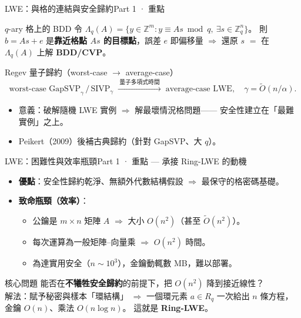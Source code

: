 \documentclass[aspectratio=169, 11pt]{beamer}
\newcommand{\Z}{\mathbb{Z}}
\begin{document}
\begin{frame}{LWE：與格的連結與安全歸約}{Part 1 · 重點}
  \begin{block}{$q$-ary 格上的 BDD}
    令 $\Lambda_q(A)=\{y\in\Z^m: y\equiv As \bmod q,\ \exists s\in\Z_q^n\}$。
    則 $b=As+e$ 是\textbf{靠近格點 $As$ 的目標點}，誤差 $e$ 即偏移量
    $\Rightarrow$ 還原 $s$ $=$ 在 $\Lambda_q(A)$ 上解 \textbf{BDD/CVP}。
  \end{block}
  \begin{block}{Regev 量子歸約（worst-case $\to$ average-case）}
    \[
      \text{worst-case GapSVP}_\gamma \,/\, \text{SIVP}_\gamma
      \;\xrightarrow{\ \text{量子多項式時間}\ }\;
      \text{average-case LWE},\quad \gamma=\tilde{O}(n/\alpha).
    \]
  \end{block}
  \begin{itemize}\small
    \item 意義：\alert{破解隨機 LWE 實例} $\Rightarrow$ \alert{解最壞情況格問題}——
      安全性建立在「最難實例」之上。
    \item Peikert（2009）後補古典歸約（針對 GapSVP、大 $q$）。
  \end{itemize}
\end{frame}

\begin{frame}{LWE：困難性與效率瓶頸}{Part 1 · 重點 — 承接 Ring-LWE 的動機}
  \begin{itemize}\small
    \item \textbf{優點}：安全性歸約乾淨、無額外代數結構假設 $\Rightarrow$ 最保守的格密碼基礎。
    \item \textbf{致命瓶頸（效率）}：
      \begin{itemize}
        \item 公鑰是 $m\times n$ 矩陣 $A$ $\Rightarrow$ 大小 $O(n^2)$（甚至 $\tilde O(n^2)$）。
        \item 每次運算為一般矩陣–向量乘 $\Rightarrow$ $O(n^2)$ 時間。
        \item 為達實用安全（$n\sim10^3$），金鑰動輒數 MB，難以部署。
      \end{itemize}
  \end{itemize}
  \begin{block}{核心問題}
    能否在\textbf{不犧牲安全歸約}的前提下，把 $O(n^2)$ 降到接近線性？\\
    \alert{解法：賦予秘密與樣本「環結構」} $\Rightarrow$ 一個環元素 $a\in R_q$
    一次給出 $n$ 條方程，金鑰 $O(n)$、乘法 $O(n\log n)$。\quad
    這就是 \textbf{Ring-LWE}。
  \end{block}
\end{frame}
\end{document}
